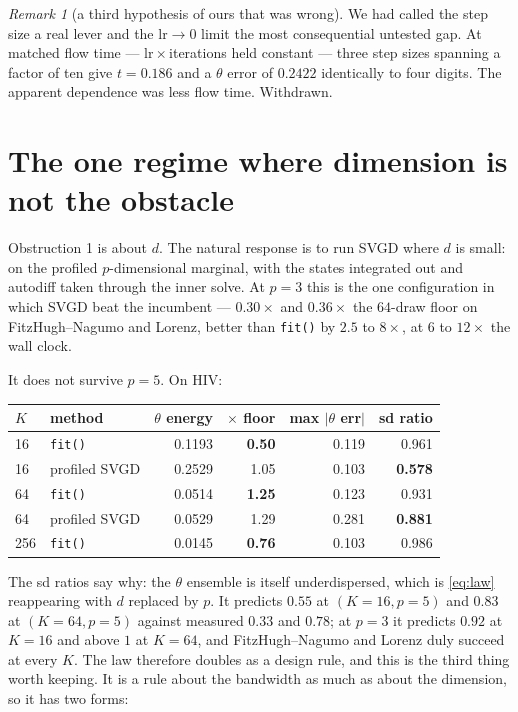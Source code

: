 \documentclass[11pt]{article}
\newcommand{\code}[1]{\texttt{\small #1}}
\theoremstyle{remark}
\newtheorem{remark}{Remark}
\begin{document}
\begin{remark}[a third hypothesis of ours that was wrong]
We had called the step size a real lever and the $\mathrm{lr}\to 0$ limit the most consequential
untested gap. At matched flow time --- $\mathrm{lr}\times$iterations held constant --- three step
sizes spanning a factor of ten give $t = 0.186$ and a $\theta$ error of $0.2422$ identically to
four digits. The apparent dependence was less flow time. Withdrawn.
\end{remark}

\section{The one regime where dimension is not the obstacle}
\label{sec:profiled}

Obstruction 1 is about $d$. The natural response is to run SVGD where $d$ is small: on the profiled
$p$-dimensional marginal, with the states integrated out and autodiff taken through the inner
solve. At $p = 3$ this is the one configuration in which SVGD beat the incumbent --- $0.30\times$
and $0.36\times$ the $64$-draw floor on FitzHugh--Nagumo and Lorenz, better than \code{fit()} by
$2.5$ to $8\times$, at $6$ to $12\times$ the wall clock.

It does not survive $p = 5$. On HIV:

\begin{center}\small
\begin{tabular}{llrrrr}
\toprule
$K$ & method & $\theta$ energy & $\times$ floor & max $|\theta$ err$|$ & sd ratio\\
\midrule
16  & \code{fit()}   & 0.1193 & \textbf{0.50} & 0.119 & 0.961\\
16  & profiled SVGD  & 0.2529 & 1.05 & 0.103 & \textbf{0.578}\\
64  & \code{fit()}   & 0.0514 & \textbf{1.25} & 0.123 & 0.931\\
64  & profiled SVGD  & 0.0529 & 1.29 & 0.281 & \textbf{0.881}\\
256 & \code{fit()}   & 0.0145 & \textbf{0.76} & 0.103 & 0.986\\
\bottomrule
\end{tabular}
\end{center}

The sd ratios say why: the $\theta$ ensemble is itself underdispersed, which is \eqref{eq:law}
reappearing with $d$ replaced by $p$. It predicts $0.55$ at $(K=16, p=5)$ and $0.83$ at
$(K=64, p=5)$ against measured $0.33$ and $0.78$; at $p = 3$ it predicts $0.92$ at $K = 16$ and
above $1$ at $K = 64$, and FitzHugh--Nagumo and Lorenz duly succeed at every $K$. The law therefore
doubles as a design rule, and this is the third thing worth keeping. It is a rule about the
bandwidth as much as about the dimension, so it has two forms:
\end{document}
